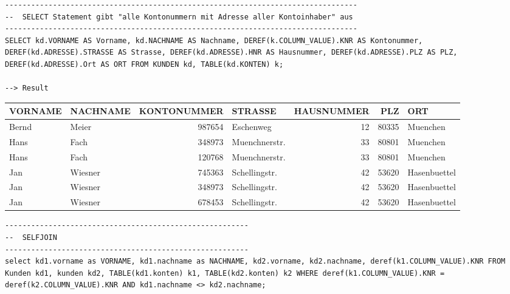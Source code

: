 \documentclass{scrartcl}
\begin{document}
\begin{landscape}
\begin{lstlisting}
---------------------------------------------------------------------------------
--  SELECT Statement gibt "alle Kontonummern mit Adresse aller Kontoinhaber" aus
---------------------------------------------------------------------------------
SELECT kd.VORNAME AS Vorname, kd.NACHNAME AS Nachname, DEREF(k.COLUMN_VALUE).KNR AS Kontonummer, DEREF(kd.ADRESSE).STRASSE AS Strasse, DEREF(kd.ADRESSE).HNR AS Hausnummer, DEREF(kd.ADRESSE).PLZ AS PLZ, DEREF(kd.ADRESSE).Ort AS ORT FROM KUNDEN kd, TABLE(kd.KONTEN) k;

--> Result
\end{lstlisting}

\begin{tabular}{ l l r l r r l }
VORNAME& NACHNAME &  KONTONUMMER  & STRASSE   &   HAUSNUMMER&  PLZ & ORT \\           
\hline
Bernd &  Meier &  987654& Eschenweg    & 12   &   80335 & Muenchen \\              
Hans &   Fach  &  348973& Muenchnerstr. & 33  &    80801&  Muenchen  \\            
Hans  &  Fach  &  120768& Muenchnerstr.& 33   &   80801 & Muenchen     \\         
Jan  &   Wiesner& 745363& Schellingstr.& 42    &  53620& Hasenbuettel   \\       
Jan  &   Wiesner& 348973& Schellingstr.& 42   &   53620& Hasenbuettel     \\     
Jan   &  Wiesner& 678453& Schellingstr. & 42  &    53620 & Hasenbuettel \\
\end{tabular}
\begin{lstlisting}
--------------------------------------------------------
--  SELFJOIN
--------------------------------------------------------
select kd1.vorname as VORNAME, kd1.nachname as NACHNAME, kd2.vorname, kd2.nachname, deref(k1.COLUMN_VALUE).KNR FROM Kunden kd1, kunden kd2, TABLE(kd1.konten) k1, TABLE(kd2.konten) k2 WHERE deref(k1.COLUMN_VALUE).KNR = deref(k2.COLUMN_VALUE).KNR AND kd1.nachname <> kd2.nachname;
\end{lstlisting}
\end{landscape}

\newpage
\end{document}
